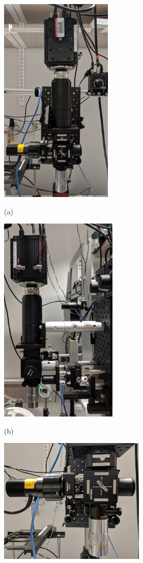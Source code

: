 \begin{figure}[htb]
  \begin{minipage}[t]{0.45\linewidth}\centering
    \includegraphics[height=10cm]{2_Body/Figures/setup3-front.jpg}
    \centerline{(a)}
  \end{minipage}\hfill
  \begin{minipage}[t]{0.45\linewidth}\centering
    \includegraphics[height=10cm]{2_Body/Figures/setup3-side.jpg}
        \centerline{(b)}
  \end{minipage}
  \begin{minipage}[t]{\linewidth}\centering
    \includegraphics[width=7cm]{2_Body/Figures/setup3-closeup.jpg}

\end{minipage}
\end{figure}
